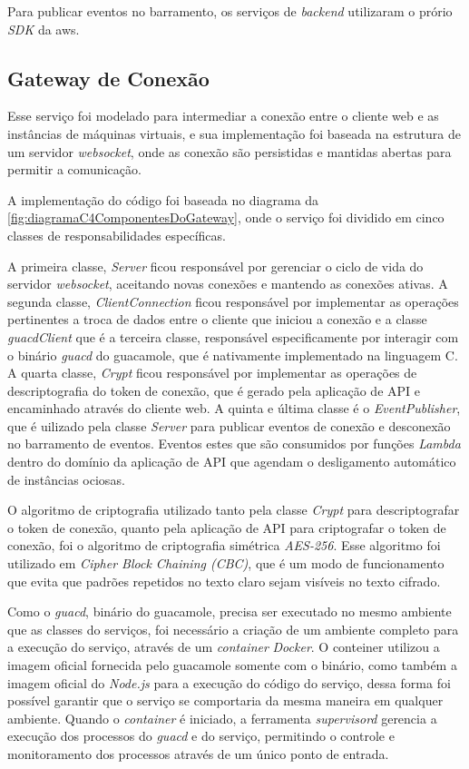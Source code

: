 Para publicar eventos no barramento, os serviços de \textit{backend} utilizaram o prório \textit{SDK} da \gls{aws}.

\subsection{Gateway de Conexão}
\label{subsec:gatewayDeConexao}

Esse serviço foi modelado para intermediar a conexão entre o cliente web e as instâncias de máquinas virtuais, e sua implementação foi baseada na estrutura de um servidor \textit{websocket}, onde as conexão são persistidas e mantidas abertas para permitir a comunicação.

A implementação do código foi baseada no diagrama da \autoref{fig:diagramaC4ComponentesDoGateway}, onde o serviço foi dividido em cinco classes de responsabilidades específicas.

A primeira classe, \textit{Server} ficou responsável por gerenciar o ciclo de vida do servidor \textit{websocket}, aceitando novas conexões e mantendo as conexões ativas. A segunda classe, \textit{ClientConnection} ficou responsável por implementar as operações pertinentes a troca de dados entre o cliente que iniciou a conexão e a classe \textit{guacdClient} que é a terceira classe, responsável especificamente por interagir com o binário \textit{guacd} do \gls{guacamole}, que é nativamente implementado na linguagem C. A quarta classe, \textit{Crypt} ficou responsável por implementar as operações de descriptografia do token de conexão, que é gerado pela aplicação de API e encaminhado através do cliente web. A quinta e última classe é o \textit{EventPublisher}, que é uilizado pela classe \textit{Server} para publicar eventos de conexão e desconexão no barramento de eventos. Eventos estes que são consumidos por funções \textit{Lambda} dentro do domínio da aplicação de API que agendam o desligamento automático de instâncias ociosas.

O algoritmo de criptografia utilizado tanto pela classe \textit{Crypt} para descriptografar o token de conexão, quanto pela aplicação de API para criptografar o token de conexão, foi o algoritmo de criptografia simétrica \textit{AES-256}. Esse algoritmo foi utilizado em \textit{Cipher Block Chaining (CBC)}, que é um modo de funcionamento que evita que padrões repetidos no texto claro sejam visíveis no texto cifrado.

Como o \textit{guacd}, binário do \gls{guacamole}, precisa ser executado no mesmo ambiente que as classes do serviços, foi necessário a criação de um ambiente completo para a execução do serviço, através de um \textit{container} \textit{Docker}. O conteiner utilizou a imagem oficial fornecida pelo \gls{guacamole} somente com o binário, como também a imagem oficial do \textit{Node.js} para a execução do código do serviço, dessa forma foi possível garantir que o serviço se comportaria da mesma maneira em qualquer ambiente. Quando o \textit{container} é iniciado, a ferramenta \textit{supervisord} gerencia a execução dos processos do \textit{guacd} e do serviço, permitindo o controle e monitoramento dos processos através de um único ponto de entrada.

